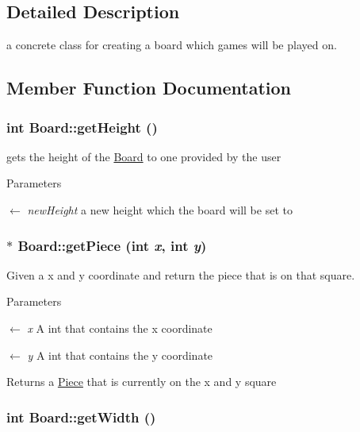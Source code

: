 \subsection{Detailed Description}
a concrete class for creating a board which games will be played on. 

\subsection{Member Function Documentation}
\hypertarget{classBoard_a14466e56568d523e5f4d0d695ccbcce1}{
\subsubsection[{getHeight}]{\setlength{\rightskip}{0pt plus 5cm}int Board::getHeight ()}}
\label{classBoard_a14466e56568d523e5f4d0d695ccbcce1}


gets the height of the \hyperlink{classBoard}{Board} to one provided by the user 
\begin{DoxyParams}{Parameters}
\item[\mbox{$\leftarrow$} {\em newHeight}]a new height which the board will be set to \end{DoxyParams}
\hypertarget{classBoard_a80649196225f3e7da030b56a9bf19f64}{
\subsubsection[{getPiece}]{$\ast$ Board::getPiece (int {\em x}, \/  int {\em y})}}
\label{classBoard_a80649196225f3e7da030b56a9bf19f64}


Given a x and y coordinate and return the piece that is on that square. 
\begin{DoxyParams}{Parameters}
\item[\mbox{$\leftarrow$} {\em x}]A int that contains the x coordinate \item[\mbox{$\leftarrow$} {\em y}]A int that contains the y coordinate \end{DoxyParams}
\begin{DoxyReturn}{Returns}
a \hyperlink{classPiece}{Piece} that is currently on the x and y square 
\end{DoxyReturn}
\hypertarget{classBoard_a67905f3b441a8605aeb50d8978415aa0}{
\subsubsection[{getWidth}]{\setlength{\rightskip}{0pt plus 5cm}int Board::getWidth ()}}
\label{classBoard_a67905f3b441a8605aeb50d8978415aa0}


